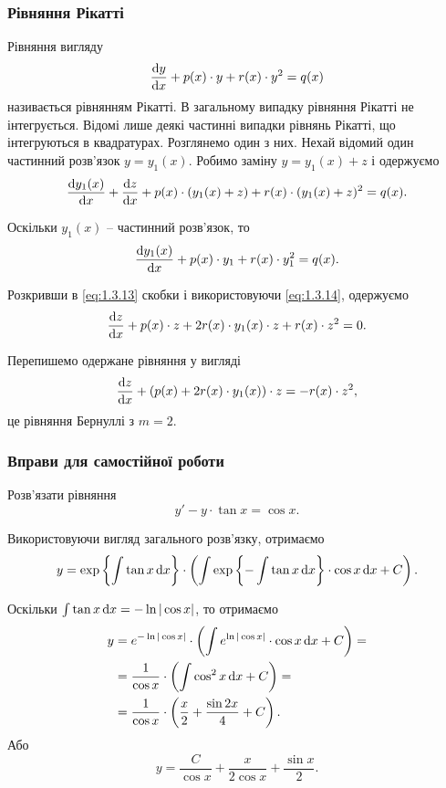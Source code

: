 \subsubsection{Рівняння Рікатті}

Рівняння вигляду 
\begin{equation}
	\label{eq:1.3.12}
	\frac{\mathop{}\!\mathrm{d} y}{\mathop{}\!\mathrm{d} x} + p(x) \cdot y + r(x) \cdot y^2 = q(x)
\end{equation} 
називається рівнянням Рікатті. В загальному випадку рівняння Рікатті не інтегрується. Відомі лише деякі частинні випадки рівнянь Рікатті, що інтегруються в квадратурах. Розглянемо один з них. Нехай відомий один частинний розв’язок $y = y_1(x)$. Робимо заміну $y = y_1(x) + z$ і одержуємо
\begin{equation}
	\label{eq:1.3.13}
	\frac{\mathop{}\!\mathrm{d} y_1(x)}{\mathop{}\!\mathrm{d} x} + \frac{\mathop{}\!\mathrm{d} z}{\mathop{}\!\mathrm{d} x} + p(x) \cdot (y_1(x) + z) + r(x) \cdot (y_1(x) + z)^2 = q(x).
\end{equation}

Оскільки $y_1(x)$ -- частинний розв’язок, то
\begin{equation}
	\label{eq:1.3.14}
	\frac{\mathop{}\!\mathrm{d} y_1(x)}{\mathop{}\!\mathrm{d} x} + p(x) \cdot y_1 + r(x) \cdot y_1^2 = q(x).
\end{equation}

Розкривши в \eqref{eq:1.3.13} скобки і використовуючи \eqref{eq:1.3.14}, одержуємо
\begin{equation}
	\label{eq:1.3.15}
	\frac{\mathop{}\!\mathrm{d} z}{\mathop{}\!\mathrm{d} x} + p(x) \cdot z + 2 r(x) \cdot y_1(x) \cdot z + r(x) \cdot z^2 = 0.
\end{equation}

Перепишемо одержане рівняння у вигляді
\begin{equation}
	\label{eq:1.3.16}
	\frac{\mathop{}\!\mathrm{d} z}{\mathop{}\!\mathrm{d} x} + \left(p(x) + 2 r(x) \cdot y_1(x)\right) \cdot z = - r(x) \cdot z^2 ,
\end{equation}
це рівняння Бернуллі з $m = 2$.

\subsubsection{Вправи для самостійної роботи}

\begin{example}
	Розв’язати рівняння \[ y' - y \cdot \tan x = \cos x.\]
\end{example}
\begin{solution}
	Використовуючи вигляд загального розв’язку, отримаємо
	\[ y = \exp\left\{\int \tan x \mathop{}\!\mathrm{d} x\right\} \cdot \left(\int \exp\left\{-\int\tan x\mathop{}\!\mathrm{d} x\right\}\cdot \cos x \mathop{}\!\mathrm{d} x+C\right). \]

	Оскільки $\int \tan x \mathop{}\!\mathrm{d} x = - \ln |\cos x|$, то отримаємо
	\begin{align*}
		y &= e^{-\ln|\cos x|} \cdot \left(\int e^{\ln|\cos x|} \cdot \cos x \mathop{}\!\mathrm{d} x+C\right) = \\
		&= \frac{1}{\cos x} \cdot \left( \int \cos^2 x \mathop{}\!\mathrm{d} x + C \right) = \\
		&= \frac{1}{\cos x} \cdot \left( \frac x2 + \frac{\sin 2x}{4} + C \right).
	\end{align*}
	Або
	\[ y = \frac{C}{\cos x} + \frac{x}{2 \cos x} + \frac{\sin x}{2}. \]
\end{solution}

